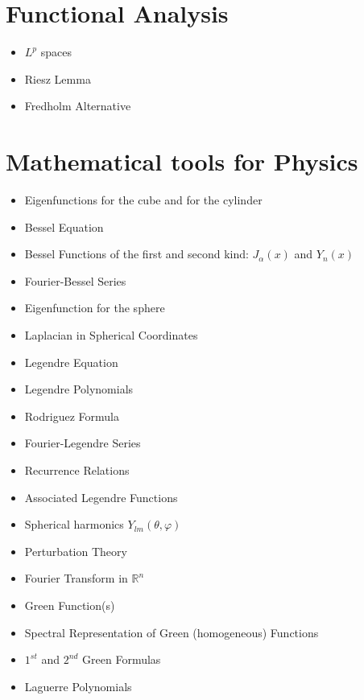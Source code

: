 \documentclass[10pt]{article}
\begin{document}
\begin{refsection}
	\nocite{do2017differential}
	\nocite{hou1997differential}
	\printbibliography[heading=subbibliography]
\end{refsection}

\section{Functional Analysis}
\begin{refsection}
\begin{itemize}
	\item $ L^p $ spaces
	\item Riesz Lemma
	\item Fredholm Alternative
\end{itemize}
\nocite{brezis2010functional}
\printbibliography[heading=subbibliography]
\end{refsection}

\section{Mathematical tools for Physics}
\begin{itemize}
	\item Eigenfunctions for the cube and for the cylinder
	\item Bessel Equation
	\item Bessel Functions of the first and second kind: $ J_{\alpha}(x) $ and $ Y_n(x) $
	\item Fourier-Bessel Series
	\item Eigenfunction for the sphere
	\item Laplacian in Spherical Coordinates
	\item Legendre Equation
	\item Legendre Polynomials
	\item Rodriguez Formula 
	\item Fourier-Legendre Series
	\item Recurrence Relations
	\item Associated Legendre Functions
	\item Spherical harmonics $ Y_{lm}(\theta,\varphi) $
	\item Perturbation Theory
	\item Fourier Transform in $\mathbb{R}^n$
	\item Green Function(s)
	\item Spectral Representation of Green (homogeneous) Functions
	\item $1^{st}$ and $2^{nd}$ Green Formulas
	\item Laguerre Polynomials
\end{itemize}
\end{document}
